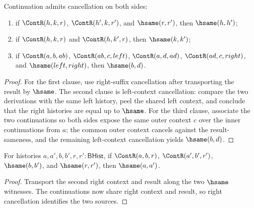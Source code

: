 \begin{theorem}
\label{thm:continuation-right-cancellation}
Continuation admits cancellation on both sides:
\begin{enumerate}
  \item if $\ContR(h,k,r)$, $\ContR(h',k,r')$, and $\hsame(r,r')$, then $\hsame(h,h')$;
  \item if $\ContR(h,k,r)$ and $\ContR(h,k',r)$, then $\hsame(k,k')$;
  \item if $\ContR(a,b,ab)$, $\ContR(ab,c,left)$, $\ContR(a,d,ad)$, $\ContR(ad,c,right)$, and $\hsame(left,right)$, then $\hsame(b,d)$.
\end{enumerate}
\end{theorem}
\begin{proof}
For the first clause, use right-suffix cancellation after transporting the result by $\hsame$. The second clause is left-context cancellation: compare the two derivations with the same left history, peel the shared left context, and conclude that the right histories are equal up to $\hsame$. For the third clause, associate the two continuations so both sides expose the same outer context $c$ over the inner continuations from $a$; the common outer context cancels against the result-sameness, and the remaining left-context cancellation yields $\hsame(b,d)$.
\end{proof}

\begin{theorem}
\label{thm:cont-cancel-hsame-right-context}
For histories $a,a',b,b',r,r':\mathsf{BHist}$, if $\ContR(a,b,r)$,
$\ContR(a',b',r')$, $\hsame(b,b')$, and $\hsame(r,r')$, then $\hsame(a,a')$.
\end{theorem}
\begin{proof}
Transport the second right context and result along the two $\hsame$ witnesses.
The continuations now share right context and result, so right cancellation
identifies the two sources.
\end{proof}


